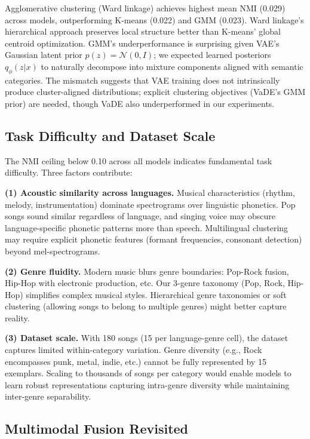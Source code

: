 \documentclass[10pt,twocolumn]{article}
\begin{document}
Agglomerative clustering (Ward linkage) achieves highest mean NMI (0.029) across models, outperforming K-means (0.022) and GMM (0.023). Ward linkage's hierarchical approach preserves local structure better than K-means' global centroid optimization. GMM's underperformance is surprising given VAE's Gaussian latent prior $p(z) = \mathcal{N}(0, I)$; we expected learned posteriors $q_\phi(z|x)$ to naturally decompose into mixture components aligned with semantic categories. The mismatch suggests that VAE training does not intrinsically produce cluster-aligned distributions; explicit clustering objectives (VaDE's GMM prior) are needed, though VaDE also underperformed in our experiments.

\subsection{Task Difficulty and Dataset Scale}

The NMI ceiling below 0.10 across all models indicates fundamental task difficulty. Three factors contribute:

\textbf{(1) Acoustic similarity across languages.} Musical characteristics (rhythm, melody, instrumentation) dominate spectrograms over linguistic phonetics. Pop songs sound similar regardless of language, and singing voice may obscure language-specific phonetic patterns more than speech. Multilingual clustering may require explicit phonetic features (formant frequencies, consonant detection) beyond mel-spectrograms.

\textbf{(2) Genre fluidity.} Modern music blurs genre boundaries: Pop-Rock fusion, Hip-Hop with electronic production, etc. Our 3-genre taxonomy (Pop, Rock, Hip-Hop) simplifies complex musical styles. Hierarchical genre taxonomies or soft clustering (allowing songs to belong to multiple genres) might better capture reality.

\textbf{(3) Dataset scale.} With 180 songs (15 per language-genre cell), the dataset captures limited within-category variation. Genre diversity (e.g., Rock encompasses punk, metal, indie, etc.) cannot be fully represented by 15 exemplars. Scaling to thousands of songs per category would enable models to learn robust representations capturing intra-genre diversity while maintaining inter-genre separability.

\subsection{Multimodal Fusion Revisited}
\end{document}
